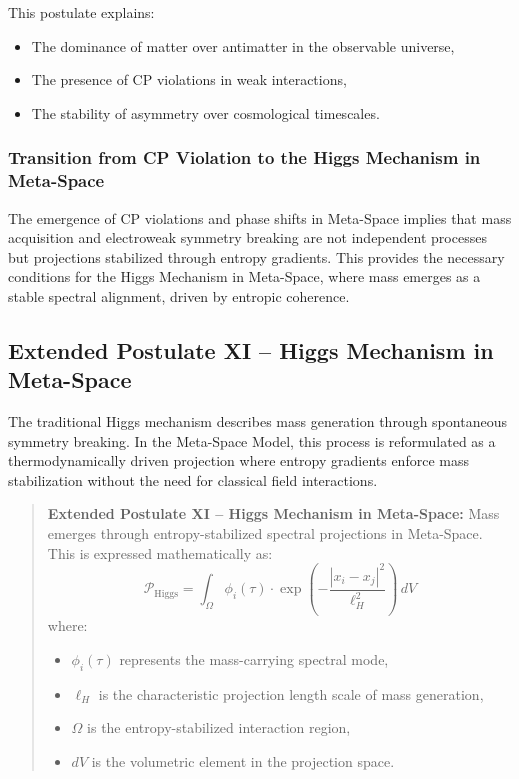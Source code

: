 \documentclass[10.5pt,a4paper]{article}
\begin{document}
This postulate explains:
\begin{itemize}
    \item The dominance of matter over antimatter in the observable universe,
    \item The presence of CP violations in weak interactions,
    \item The stability of asymmetry over cosmological timescales.
\end{itemize}

\subsubsection*{Transition from CP Violation to the Higgs Mechanism in Meta-Space}

The emergence of CP violations and phase shifts in Meta-Space implies that mass acquisition and electroweak 
symmetry breaking are not independent processes but projections stabilized through entropy gradients. 
This provides the necessary conditions for the Higgs Mechanism in Meta-Space, where mass emerges 
as a stable spectral alignment, driven by entropic coherence.

\subsection{Extended Postulate XI – Higgs Mechanism in Meta-Space}

The traditional Higgs mechanism describes mass generation through spontaneous symmetry breaking. In the 
Meta-Space Model, this process is reformulated as a thermodynamically driven projection where entropy gradients 
enforce mass stabilization without the need for classical field interactions.

\begin{quote}
\textbf{Extended Postulate XI – Higgs Mechanism in Meta-Space:}  
Mass emerges through entropy-stabilized spectral projections in Meta-Space. This is expressed mathematically as:
\[
\mathcal{P}_{\text{Higgs}} = \int_\Omega \phi_i(\tau) \cdot \exp\left(-\frac{|x_i - x_j|^2}{\ell_H^2}\right) \, dV
\]
where:
\begin{itemize}
    \item $\phi_i(\tau)$ represents the mass-carrying spectral mode,
    \item $\ell_H$ is the characteristic projection length scale of mass generation,
    \item $\Omega$ is the entropy-stabilized interaction region,
    \item $dV$ is the volumetric element in the projection space.
\end{itemize}
\end{quote}
\end{document}
